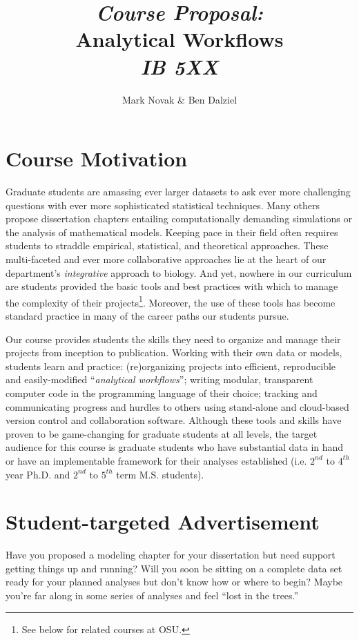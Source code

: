 \documentclass[10pt]{article}
\author{Mark Novak \& Ben Dalziel}
\title{\emph{Course Proposal:}\\Analytical Workflows\\\emph{IB 5XX}}
\date{}
\begin{document}
\maketitle

\section*{Course Motivation}
Graduate students are amassing ever larger datasets to ask ever more challenging questions with ever 
more sophisticated  statistical techniques. 
Many others propose dissertation chapters entailing computationally demanding simulations or the 
analysis of mathematical models. 
Keeping pace in their field often requires students to straddle empirical, statistical, and theoretical 
approaches. 
These multi-faceted and ever more collaborative approaches lie at the heart of our 
department's \emph{integrative} approach to biology.
And yet, nowhere in our curriculum are students provided the basic tools and best practices with which 
to manage the complexity of their projects\footnote{See below for related courses at OSU.}. 
Moreover, the use of these tools has become standard practice in many of the career paths our 
students pursue.

Our course provides students the skills they need to organize and manage their projects from 
inception to publication.  
Working with their own data or models, students learn and practice: (re)organizing projects into 
efficient, reproducible and easily-modified ``\emph{analytical workflows}''; 
writing modular, transparent computer code in the programming language of their choice;
tracking and communicating progress and hurdles to others using stand-alone and cloud-based version 
control and collaboration software.
Although these tools and skills have proven to be game-changing for graduate students at all levels, the 
target audience for this course is graduate students who have substantial data in hand or have an 
implementable framework for their analyses established (i.e. $2^{nd}$ to $4^{th}$ year Ph.D. and 
$2^{nd}$ to $5^{th}$ term M.S. students).

\section*{Student-targeted Advertisement}
Have you proposed a modeling chapter for your dissertation but need support getting things up and 
running?  
Will you soon be sitting on a complete data set ready for your planned analyses but don't know how or 
where to begin?
Maybe you're far along in some series of analyses and feel ``lost in the trees.''
\end{document}
